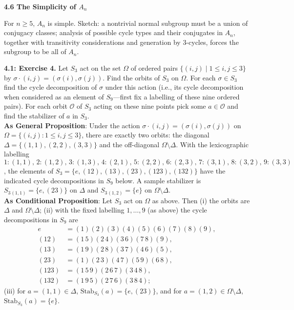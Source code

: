 \documentclass[11pt]{article}
\theoremstyle{definition}
\begin{document}
\textbf{4.6 The Simplicity of $A_n$}

\medskip
For $n\ge 5$, $A_n$ is simple. Sketch: a nontrivial normal subgroup must be a union of conjugacy classes; analysis of possible cycle types and their conjugates in $A_n$, together with transitivity considerations and generation by $3$-cycles, forces the subgroup to be all of $A_n$.

\newpage

\newpage

\noindent \textbf{4.1: Exercise 4.} Let $S_3$ act on the set $\Omega$ of ordered pairs $\{(i,j)\mid 1\le i,j\le 3\}$ by $\sigma\!\cdot\!(i,j)=(\sigma(i),\sigma(j))$. Find the orbits of $S_3$ on $\Omega$. For each $\sigma\in S_3$ find the cycle decomposition of $\sigma$ under this action (i.e., its cycle decomposition when considered as an element of $S_9$—first fix a labelling of these nine ordered pairs). For each orbit $\mathcal O$ of $S_3$ acting on these nine points pick some $a\in\mathcal O$ and find the stabilizer of $a$ in $S_3$.\\ %

\noindent\textbf{As General Proposition}: Under the action $\sigma\!\cdot\!(i,j)=(\sigma(i),\sigma(j))$ on $\Omega=\{(i,j):1\le i,j\le 3\}$, there are exactly two orbits: the diagonal $\Delta=\{(1,1),(2,2),(3,3)\}$ and the off-diagonal $\Omega\setminus\Delta$. With the lexicographic labelling $1:(1,1),\,2:(1,2),\,3:(1,3),\,4:(2,1),\,5:(2,2),\,6:(2,3),\,7:(3,1),\,8:(3,2),\,9:(3,3)$, the elements of $S_3=\{e,(12),(13),(23),(123),(132)\}$ have the indicated cycle decompositions in $S_9$ below. A sample stabilizer is $S_3{}_{(1,1)}=\{e,(23)\}$ on $\Delta$ and $S_3{}_{(1,2)}=\{e\}$ on $\Omega\setminus\Delta$.\\

\noindent \textbf{As Conditional Proposition}: Let $S_3$ act on $\Omega$ as above. Then (i) the orbits are $\Delta$ and $\Omega\setminus\Delta$; (ii) with the fixed labelling $1,\dots,9$ (as above) the cycle decompositions in $S_9$ are
\[
\begin{aligned}
e&=(1)(2)(3)(4)(5)(6)(7)(8)(9),\\
(12)&=(1\,5)(2\,4)(3\,6)(7\,8)(9),\\
(13)&=(1\,9)(2\,8)(3\,7)(4\,6)(5),\\
(23)&=(1)(2\,3)(4\,7)(5\,9)(6\,8),\\
(123)&=(1\,5\,9)(2\,6\,7)(3\,4\,8),\\
(132)&=(1\,9\,5)(2\,7\,6)(3\,8\,4);
\end{aligned}
\]
(iii) for $a=(1,1)\in\Delta$, $\mathrm{Stab}_{S_3}(a)=\{e,(23)\}$, and for $a=(1,2)\in\Omega\setminus\Delta$, $\mathrm{Stab}_{S_3}(a)=\{e\}$.\\
\end{document}
